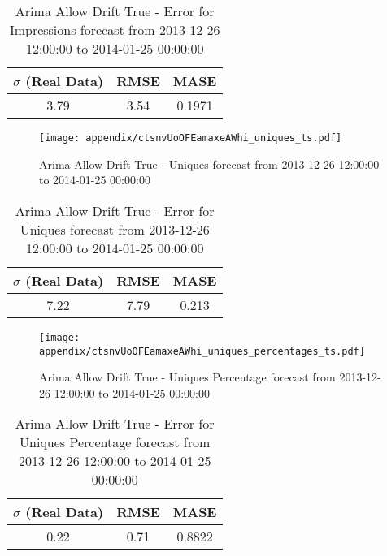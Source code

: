 \begin{table}[H]
\centering
\footnotesize
\begin{tabular}{ccc}
$\sigma$ (Real Data) & RMSE & MASE   \\ \hline
3.79 & 3.54 & 0.1971 \\
\end{tabular}

\vspace{0.5cm}

\caption[]{
Arima Allow Drift True - Error for Impressions forecast from 2013-12-26 12:00:00 to 2014-01-25 00:00:00}
\end{table}

\begin{figure}[H] \begin{center} \leavevmode
\texttt{[image: appendix/ctsnvUoOFEamaxeAWhi\_uniques\_ts.pdf]} \caption[]{
Arima Allow Drift True - Uniques forecast from 2013-12-26 12:00:00 to 2014-01-25 00:00:00} \label{fig:appendix/ctsnvUoOFEamaxeAWhi_uniques_ts.pdf} \end{center}
\end{figure}

\begin{table}[H]
\centering
\footnotesize
\begin{tabular}{ccc}
$\sigma$ (Real Data) & RMSE & MASE   \\ \hline
7.22 & 7.79 & 0.213 \\
\end{tabular}

\vspace{0.5cm}

\caption[]{
Arima Allow Drift True - Error for Uniques forecast from 2013-12-26 12:00:00 to 2014-01-25 00:00:00}
\end{table}

\begin{figure}[H] \begin{center} \leavevmode
\texttt{[image: appendix/ctsnvUoOFEamaxeAWhi\_uniques\_percentages\_ts.pdf]} \caption[]{
Arima Allow Drift True - Uniques Percentage forecast from 2013-12-26 12:00:00 to 2014-01-25 00:00:00} \label{fig:appendix/ctsnvUoOFEamaxeAWhi_uniques_percentages_ts.pdf} \end{center}
\end{figure}

\begin{table}[H]
\centering
\footnotesize
\begin{tabular}{ccc}
$\sigma$ (Real Data) & RMSE & MASE   \\ \hline
0.22 & 0.71 & 0.8822 \\
\end{tabular}

\vspace{0.5cm}

\caption[]{
Arima Allow Drift True - Error for Uniques Percentage forecast from 2013-12-26 12:00:00 to 2014-01-25 00:00:00}
\end{table}


